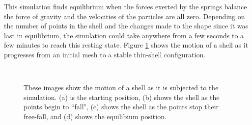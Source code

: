 \documentclass{thesis}
\begin{document}
This simulation finds equilibrium when the forces exerted by the springs balance the force of gravity and the velocities of the particles
are all zero.  Depending on the number of points in the shell and the changes made to the shape since it was last in equilibrium, the
simulation could take anywhere from a few seconds to a few minutes to reach this resting state.  Figure \ref{fig:wireframe_sim} shows
the motion of a shell as it progresses from an initial mesh to a stable thin-shell configuration.

\begin{figure}
\centering
{}
\\
\caption[Simulation frames]{These images show the motion of a shell as it is subjected to the simulation.  (a) is the starting position,
(b) shows the shell as the points begin to ``fall", (c) shows the shell as the points stop their free-fall, and (d) shows the equilibium
position.}
\label{fig:wireframe_sim}
\end{figure}
\end{document}
